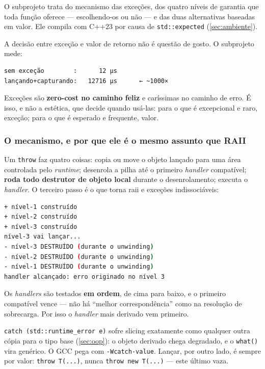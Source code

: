 O subprojeto  trata do mecanismo das exceções, dos quatro níveis
de garantia que toda função oferece --- escolhendo-os ou não --- e das duas
alternativas baseadas em valor. Ele compila com C++23 por causa de
\texttt{std::expected} (\cref{sec:ambiente}).

A decisão entre exceção e valor de retorno não é questão de gosto. O subprojeto
mede:

\begin{lstlisting}[style=bt, language=bash,
    caption={Saída de \texttt{src/errors/}: 20\,000 iterações.}]
sem exceção        :      12 µs
lançando+capturando:   12716 µs      ← ~1000×
\end{lstlisting}

Exceções são \textbf{zero-cost no caminho feliz} e caríssimas no caminho de
erro. É isso, e não a estética, que decide quando usá-las: para o que é
excepcional e raro, exceção; para o que é esperado e frequente, valor.

\subsubsection{O mecanismo, e por que ele é o mesmo assunto que RAII}

Um \texttt{throw} faz quatro coisas: copia ou move o objeto lançado para uma
área controlada pelo \emph{runtime}; desenrola a pilha até o primeiro
\emph{handler} compatível; \textbf{roda todo destrutor de objeto local} durante o
desenrolamento; executa o \emph{handler}. O terceiro passo é o que torna
\gls{raii} e exceções indissociáveis:

\begin{lstlisting}[style=bt, language=bash,
    caption={Saída de \texttt{src/errors/}: três destrutores rodaram sem uma
             linha de limpeza escrita à mão.}]
+ nível-1 construído
+ nível-2 construído
+ nível-3 construído
nível-3 vai lançar...
- nível-3 DESTRUÍDO (durante o unwinding)
- nível-2 DESTRUÍDO (durante o unwinding)
- nível-1 DESTRUÍDO (durante o unwinding)
handler alcançado: erro originado no nível 3
\end{lstlisting}

Os \emph{handlers} são testados \textbf{em ordem}, de cima para baixo, e o
primeiro compatível vence --- não há ``melhor correspondência'' como na
resolução de sobrecarga. Por isso o \emph{handler} mais derivado vem primeiro.

\begin{armadilha}
\texttt{catch (std::runtime\_error e)} sofre \gls{slicing} exatamente como
qualquer outra cópia para o tipo base (\cref{sec:oop}): o objeto derivado chega
degradado, e o \texttt{what()} vira genérico. O GCC pega com
\texttt{-Wcatch-value}. Lançar, por outro lado, é sempre por valor:
\texttt{throw T(...)}, nunca \texttt{throw new T(...)} --- este último vaza.
\end{armadilha}

